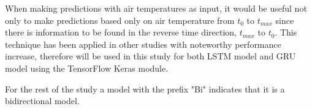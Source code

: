 When making predictions with air temperatures as input, it would be useful not only to make predictions based only on air temperature from $t_0$ to $t_{max}$ since there is information to be found in the reverse time direction, $t_{max}$ to $t_0$. This technique has been applied in other studies with noteworthy performance increase, therefore will be used in this study for both LSTM model and GRU model using the TensorFlow Keras module. 

For the rest of the study a model with the prefix "Bi" indicates that it is a bidirectional model.
